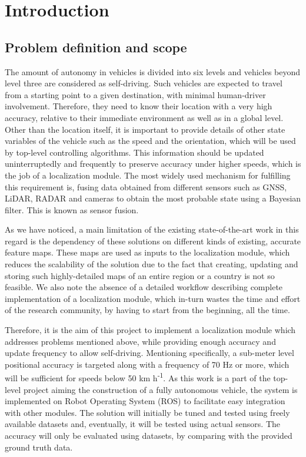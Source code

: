 \chapter{Introduction}
\glsresetall


\section{Problem definition and scope}
The amount of autonomy in vehicles is divided into six levels and vehicles beyond level three are considered as self-driving. Such vehicles are expected to travel from a starting point to a given destination, with minimal human-driver involvement. Therefore, they need to know their location with a very high accuracy, relative to their immediate environment as well as in a global level. Other than the location itself, it is important to provide details of other state variables of the vehicle such as the speed and the orientation, which will be used by top-level controlling algorithms. This information should be updated uninterruptedly and frequently to preserve accuracy under higher speeds, which is the job of a localization module. The most widely used mechanism for fulfilling this requirement is, fusing data obtained from different sensors such as \gls{GNSS}, \gls{LiDAR}, \gls{RADAR} and cameras to obtain the most probable state using a Bayesian filter. This is known as sensor fusion.

As we have noticed, a main limitation of the existing state-of-the-art work in this regard is the dependency of these solutions on different kinds of existing, accurate feature maps. These maps are used as inputs to the localization module, which reduces the scalability of the solution due to the fact that creating, updating and storing such highly-detailed maps of an entire region or a country is not so feasible. We also note the absence of a detailed workflow describing complete implementation of a localization module, which in-turn wastes the time and effort of the research community, by having to start from the beginning, all the time.

Therefore, it is the aim of this project to implement a localization module which addresses problems mentioned above, while providing enough accuracy and update frequency to allow self-driving. Mentioning specifically, a sub-meter level positional accuracy is targeted along with a frequency of 70 Hz or more, which will be sufficient for speeds below 50 km h\textsuperscript{-1}\cite{pa:ComputerArchitectures}. As this work is a part of the top-level project aiming the construction of a fully autonomous vehicle, the system is implemented on Robot Operating System (ROS) to facilitate easy integration with other modules. The solution will initially be tuned and tested using freely available datasets and, eventually, it will be tested using actual sensors. The accuracy will only be evaluated using datasets, by comparing with the provided ground truth data.

